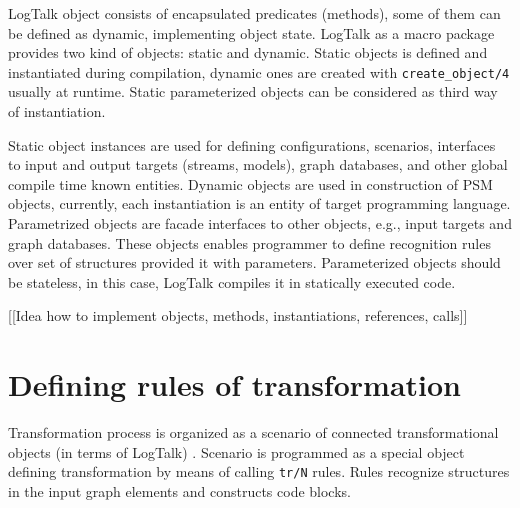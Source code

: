 \documentclass[conference]{IEEEtran}
\begin{document}
LogTalk object consists of encapsulated predicates (methods), some of them can be defined as dynamic, implementing object state.  LogTalk as a macro package provides two kind of objects: static and dynamic.  Static objects is defined and instantiated during compilation, dynamic ones are created with \texttt{create\_object/4} usually at runtime.  Static parameterized objects can be considered as third way of instantiation.

Static object instances are used for defining configurations, scenarios, interfaces to input and output targets (streams, models), graph databases, and other global compile time known entities.  Dynamic objects are used in construction of PSM objects, currently, each instantiation is an entity of target programming language.  Parametrized objects are facade interfaces to other objects, e.g., input targets and graph databases.  These objects enables programmer to define recognition rules over set of structures provided it with parameters.  Parameterized objects should be stateless, in this case, LogTalk compiles it in statically executed code.



[[Idea how to implement objects, methods, instantiations, references, calls]]

\section{Defining rules of transformation}
\label{sec:mda-rules}

Transformation process is organized as a scenario of connected transformational objects (in terms of LogTalk) \cite{tereh1}.  Scenario is programmed as a special object defining transformation by means of calling \verb|tr/N| rules.  Rules recognize structures in the input graph elements and constructs code blocks.
\end{document}
